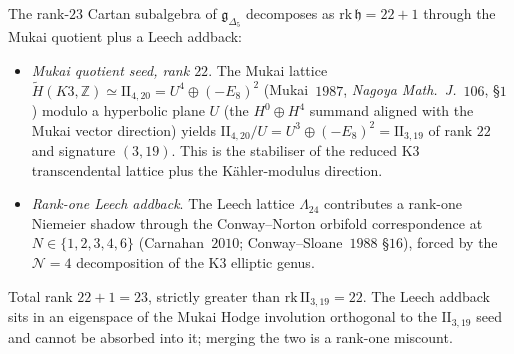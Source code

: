 \begin{remark}[Rank-$23$ Cartan of $\mathfrak{g}_{\Delta_5}$ from $\mathrm{II}_{4, 20}/U = \mathrm{II}_{3, 19}$ plus Leech addback]
\label{rem:gdelta5-rank-23-leech-addback}
The rank-$23$ Cartan subalgebra of $\mathfrak{g}_{\Delta_5}$ decomposes as $\mathrm{rk}\,\mathfrak{h} = 22 + 1$ through the Mukai quotient plus a Leech addback:
\begin{itemize}
\item \emph{Mukai quotient seed, rank $22$}. The Mukai lattice $\widetilde H(K3, \mathbb{Z}) \simeq \mathrm{II}_{4, 20} = U^4 \oplus (-E_8)^2$ (Mukai~$1987$, \emph{Nagoya Math.\ J.}~$106$, \S$1$) modulo a hyperbolic plane $U$ (the $H^0 \oplus H^4$ summand aligned with the Mukai vector direction) yields $\mathrm{II}_{4, 20}/U = U^3 \oplus (-E_8)^2 = \mathrm{II}_{3, 19}$ of rank $22$ and signature $(3, 19)$. This is the stabiliser of the reduced K3 transcendental lattice plus the K\"ahler-modulus direction.
\item \emph{Rank-one Leech addback}. The Leech lattice $\Lambda_{24}$ contributes a rank-one Niemeier shadow through the Conway--Norton orbifold correspondence at $N \in \{1, 2, 3, 4, 6\}$ (Carnahan~$2010$; Conway--Sloane~$1988$ \S$16$), forced by the $\mathcal{N} = 4$ decomposition of the K3 elliptic genus.
\end{itemize}
Total rank $22 + 1 = 23$, strictly greater than $\mathrm{rk}\,\mathrm{II}_{3, 19} = 22$. The Leech addback sits in an eigenspace of the Mukai Hodge involution orthogonal to the $\mathrm{II}_{3, 19}$ seed and cannot be absorbed into it; merging the two is a rank-one miscount.
\end{remark}


